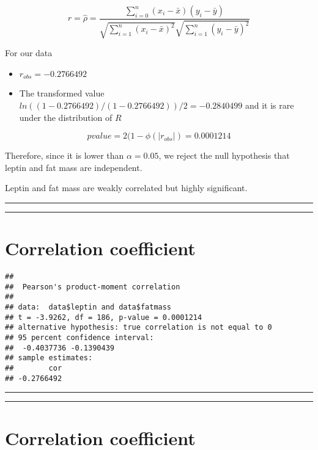 \documentclass[
]{book}
\begin{document}
\[r=\hat{\rho}=\frac{\sum_{i=0}^n(x_i-\bar{x})(y_i-\bar{y})}{\sqrt{\sum_{i=1}^n(x_i-\bar{x})^2}\sqrt{\sum_{i=1}^n(y_i-\bar{y})^2}}\]

For our data

\begin{itemize}
\item
  \(r_{obs}=-0.2766492\)
\item
  The transformed value \(ln((1-0.2766492)/(1-0.2766492))/2=-0.2840499\) and it is rare under the distribution of \(R\)
\end{itemize}

\[pvalue=2(1- \phi(|r_{obs}|)=0.0001214\]

Therefore, since it is lower than \(\alpha=0.05\), we reject the null hypothesis that leptin and fat mass are independent.

Leptin and fat mass are weakly correlated but highly significant.

\begin{center}\rule{0.5\linewidth}{0.5pt}\end{center}

\begin{center}\rule{0.5\linewidth}{0.5pt}\end{center}

\hypertarget{correlation-coefficient-1}{%
\section{Correlation coefficient}\label{correlation-coefficient-1}}

\begin{verbatim}
## 
##  Pearson's product-moment correlation
## 
## data:  data$leptin and data$fatmass
## t = -3.9262, df = 186, p-value = 0.0001214
## alternative hypothesis: true correlation is not equal to 0
## 95 percent confidence interval:
##  -0.4037736 -0.1390439
## sample estimates:
##        cor 
## -0.2766492
\end{verbatim}

\begin{center}\rule{0.5\linewidth}{0.5pt}\end{center}

\begin{center}\rule{0.5\linewidth}{0.5pt}\end{center}

\hypertarget{correlation-coefficient-2}{%
\section{Correlation coefficient}\label{correlation-coefficient-2}}
\end{document}
